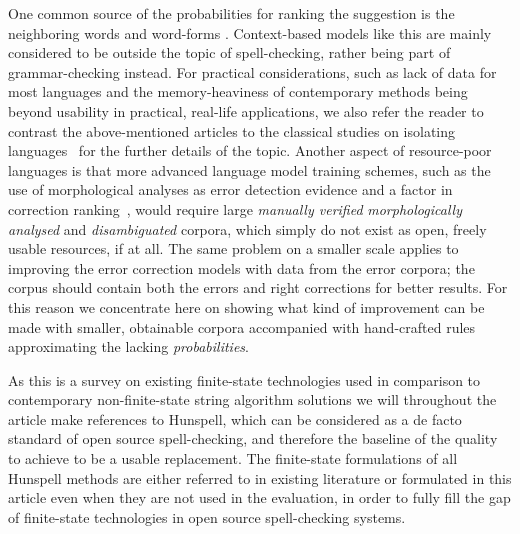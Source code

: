\documentclass[a4paper,12pt]{article}
\begin{document}
One common source of the probabilities for ranking the suggestion is the
neighboring words and word-forms \cite[]{pirinen2012improving,otero/2007}. 
Context-based models like this are mainly considered to be outside the topic of
spell-checking, rather being part of grammar-checking instead. For practical
considerations, such as lack of data for most languages and the
memory-heaviness of contemporary methods being beyond usability in
practical, real-life applications, we also refer the reader to contrast
the above-mentioned articles to the classical studies on isolating
languages~\cite[]{mays/1991,wilcoxohearn2008realword} for the further details
of the topic.
Another aspect of resource-poor languages is that more advanced language model
training schemes, such as the use of morphological analyses as error detection
evidence \cite[]{mays/1991} and a factor in correction
ranking~\cite[]{otero/2007}, would require large \emph{manually verified}
\emph{morphologically analysed} and \emph{disambiguated} corpora, which simply
do not exist as open, freely usable resources, if at all. The same problem on a
smaller scale applies to improving the error correction models with data from
the error corpora; the corpus should contain both the errors and right
corrections for better results. For this reason we concentrate here on showing
what kind of improvement can be made with smaller, obtainable corpora
accompanied with hand-crafted rules approximating the lacking
\emph{probabilities}.

As this is a survey on existing finite-state technologies used in comparison
to contemporary non-finite-state string algorithm solutions we will throughout
the article make references to Hunspell, which can be considered as a de facto
standard of open source spell-checking, and therefore the baseline of the
quality to achieve to be a usable replacement. The finite-state formulations of
all Hunspell methods are either referred to in existing literature or
formulated in this article even when they are not used in the evaluation, in
order to fully fill the gap of finite-state technologies in open source
spell-checking systems.
\end{document}
